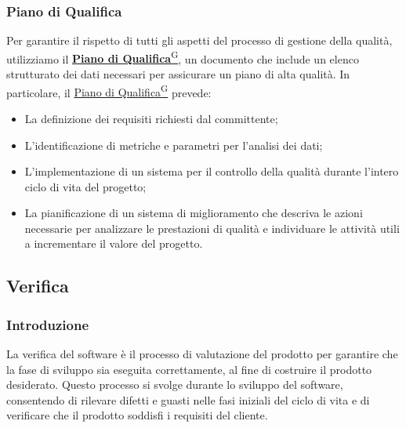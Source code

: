 \subsubsection{Piano di Qualifica}
Per garantire il rispetto di tutti gli aspetti del processo di gestione della qualità, utilizziamo il 
\href{https://code7crusaders.github.io/docs/RTB/documentazione_interna/glossario.html#piano-di-qualifica}{\textbf{Piano di Qualifica}\textsuperscript{G}}, un documento che include un elenco strutturato dei dati necessari per assicurare un piano di alta qualità. In particolare, il \href{https://code7crusaders.github.io/docs/RTB/documentazione_interna/glossario.html#piano-di-qualifica}{Piano di Qualifica\textsuperscript{G}} prevede:  
\begin{itemize}
    \item La definizione dei requisiti richiesti dal committente;
    \item L’identificazione di metriche e parametri per l’analisi dei dati;
    \item L’implementazione di un sistema per il controllo della qualità durante l’intero ciclo di vita del progetto;
    \item La pianificazione di un sistema di miglioramento che descriva le azioni necessarie per analizzare le prestazioni di qualità e individuare le attività utili a incrementare il valore del progetto.
\end{itemize}














\subsection{Verifica}
\subsubsection{Introduzione}
La verifica del software è il processo di valutazione del prodotto per garantire che la fase di sviluppo 
sia eseguita correttamente, al fine di costruire il prodotto desiderato. 
Questo processo si svolge durante lo sviluppo del software, consentendo di rilevare difetti e guasti 
nelle fasi iniziali del ciclo di vita e di verificare che il prodotto soddisfi i requisiti del cliente.

